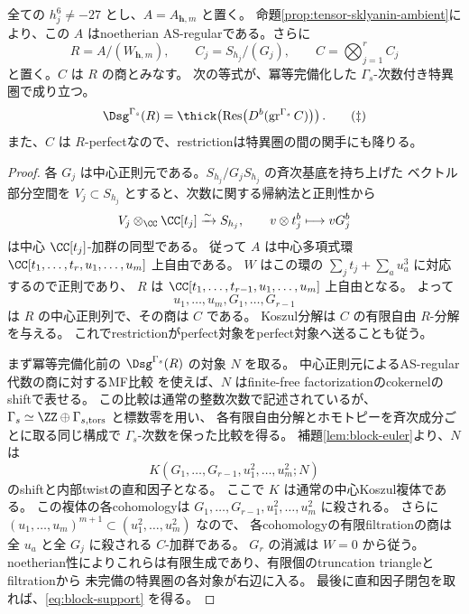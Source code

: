 \begin{proposition}[生成性の中心商への帰着]\label{prop:block-support}
 全ての \(h_j^6\ne-27\) とし、\(A=A_{\mathbf h,m}\) と置く。
 命題\ref{prop:tensor-sklyanin-ambient}により、この \(A\) はnoetherian AS-regularである。さらに
 \[
 R=A/(W_{\mathbf h,m}),\qquad
 C_j=S_{h_j}/(G_j),\qquad C=\bigotimes_{j=1}^r C_j
 \]
 と置く。\(C\) は \(R\) の商とみなす。
 次の等式が、冪等完備化した \(\Gamma_s\)-次数付き特異圏で成り立つ。
 \[
 \Dsg^{\Gamma_s}(R)
 =\thick\!\left(
 \operatorname{Res}\bigl(D^b(\operatorname{gr}^{\Gamma_s}C)\bigr)
 \right).
 \tag{\(\ddagger\)}\label{eq:block-support}
 \]
 また、\(C\) は \(R\)-perfectなので、restrictionは特異圏の間の関手にも降りる。
\end{proposition}
\begin{proof}
 各 \(G_j\) は中心正則元である。\(S_{h_j}/G_jS_{h_j}\) の斉次基底を持ち上げた
 ベクトル部分空間を \(V_j\subset S_{h_j}\) とすると、次数に関する帰納法と正則性から
 \[
 V_j\otimes_\CC\CC[t_j]\xrightarrow{\sim}S_{h_j},\qquad
 v\otimes t_j^b\longmapsto vG_j^b
 \]
 は中心 \(\CC[t_j]\)-加群の同型である。
 従って \(A\) は中心多項式環
 \(\CC[t_1,\ldots,t_r,u_1,\ldots,u_m]\) 上自由である。
 \(W\) はこの環の \(\sum_jt_j+\sum_au_a^3\) に対応するので正則であり、
 \(R\) は \(\CC[t_1,\ldots,t_{r-1},u_1,\ldots,u_m]\) 上自由となる。
 よって
 \[
 u_1,\ldots,u_m,G_1,\ldots,G_{r-1}
 \]
 は \(R\) の中心正則列で、その商は \(C\) である。
 Koszul分解は \(C\) の有限自由 \(R\)-分解を与える。
 これでrestrictionがperfect対象をperfect対象へ送ることも従う。

 まず冪等完備化前の \(\Dsg^{\Gamma_s}(R)\) の対象 \(N\) を取る。
 中心正則元によるAS-regular代数の商に対するMF比較
 \cite[Theorem 5.8]{CCKM}を使えば、\(N\) はfinite-free factorizationのcokernelのshiftで表せる。
 この比較は通常の整数次数で記述されているが、
 \(\Gamma_s\simeq\ZZ\oplus\Gamma_{s,\mathrm{tors}}\) と標数零を用い、
 各有限自由分解とホモトピーを斉次成分ごとに取る同じ構成で
 \(\Gamma_s\)-次数を保った比較を得る。
 補題\ref{lem:block-euler}より、\(N\) は
 \[
 K(G_1,\ldots,G_{r-1},u_1^2,\ldots,u_m^2;N)
 \]
 のshiftと内部twistの直和因子となる。
 ここで \(K\) は通常の中心Koszul複体である。
 この複体の各cohomologyは \(G_1,\ldots,G_{r-1},u_1^2,\ldots,u_m^2\) に殺される。
 さらに \((u_1,\ldots,u_m)^{m+1}\subset(u_1^2,\ldots,u_m^2)\) なので、
 各cohomologyの有限filtrationの商は全 \(u_a\) と全 \(G_j\) に殺される \(C\)-加群である。
 \(G_r\) の消滅は \(W=0\) から従う。
 noetherian性によりこれらは有限生成であり、有限個のtruncation triangleとfiltrationから
 未完備の特異圏の各対象が右辺に入る。
 最後に直和因子閉包を取れば、\eqref{eq:block-support} を得る。
\end{proof}

